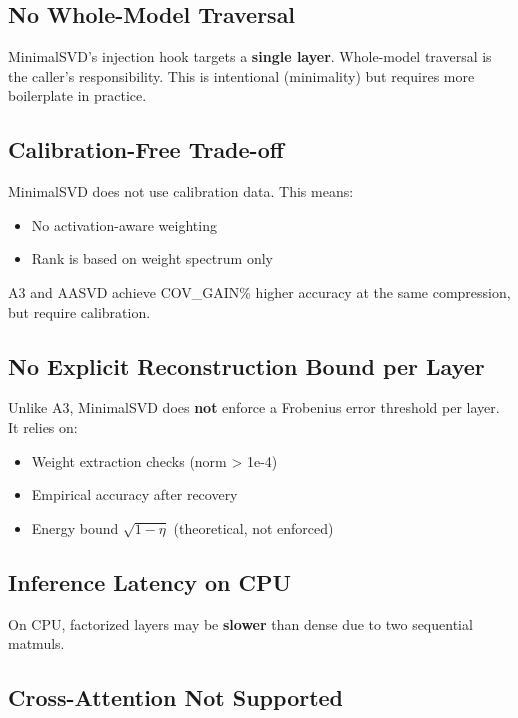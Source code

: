 \subsection{No Whole-Model Traversal}

MinimalSVD's injection hook targets a \textbf{single layer}. Whole-model 
traversal is the caller's responsibility. This is intentional (minimality) 
but requires more boilerplate in practice.

\subsection{Calibration-Free Trade-off}

MinimalSVD does not use calibration data. This means:
\begin{itemize}
\item No activation-aware weighting
\item Rank is based on weight spectrum only

\end{itemize}
A3 and AASVD achieve {{COV\_GAIN}}\% higher accuracy at the same compression, 
but require calibration.

\subsection{No Explicit Reconstruction Bound per Layer}

Unlike A3, MinimalSVD does \textbf{not} enforce a Frobenius error threshold per 
layer. It relies on:
\begin{itemize}
\item Weight extraction checks (norm > 1e-4)
\item Empirical accuracy after recovery
\item Energy bound $\sqrt{1 - \eta}$ (theoretical, not enforced)

\end{itemize}
\subsection{Inference Latency on CPU}

On CPU, factorized layers may be \textbf{slower} than dense due to two sequential 
matmuls.

\subsection{Cross-Attention Not Supported}

